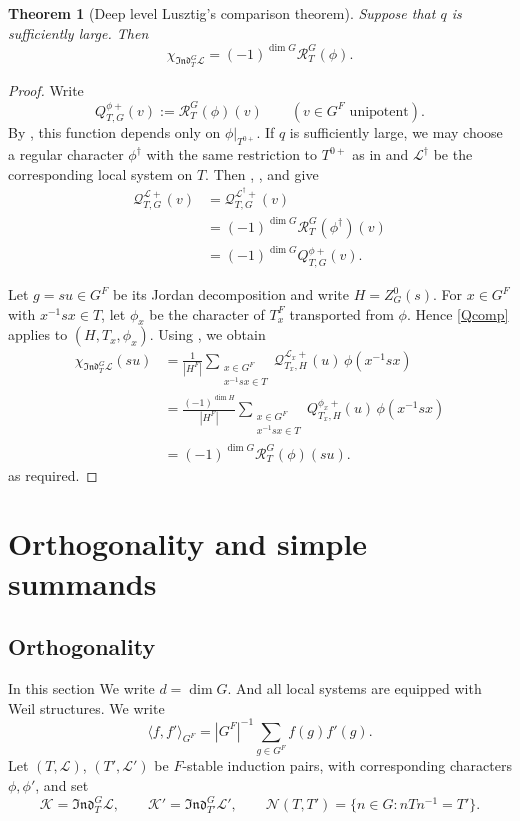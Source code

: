 \documentclass[11pt,letterpaper]{amsart}
\newtheorem{theorem}{Theorem}
\theoremstyle{definition}
\numberwithin{equation}{section}
\numberwithin{theorem}{section}
\begin{document}
\begin{theorem}[Deep level Lusztig's comparison theorem]
\label{LC}
Suppose that $q$ is sufficiently large. Then
\[
 \chi_{\mathfrak{Ind}^{G}_{T}\mathcal L}
 =(-1)^{\dim G}\mathcal R^{G}_{T}(\phi).
\]
\end{theorem}
\begin{proof}
Write
\[
 Q_{T,G}^{\phi+}(v)
 :=\mathcal R_T^G(\phi)(v)
 \qquad (v\in G^F\text{ unipotent}).
\]
By \cite[Theorem 3.1]{LN26}, this function depends only on
$\phi|_{T^{0+}}$. If $q$ is sufficiently large, we may choose a
regular character $\phi^\dagger$ with the same restriction to $T^{0+}$ as in  and $\mathcal{L}^{\dagger}$ be the corresponding local system on $T$.
Then ,
\cite[Theorem 8.6]{INY25}, and 
\cite[Theorem 3.1]{LN26} give
\begin{equation}\label{Qcomp}
 \begin{aligned}
 \mathcal{Q}_{T,G}^{\mathcal L+}(v)
 &=\mathcal{Q}_{T,G}^{\mathcal L^{\dagger}+}(v)\\
 &=(-1)^{\dim G}\mathcal R_T^G(\phi^\dagger)(v)\\
 &=(-1)^{\dim G} Q_{T,G}^{\phi+}(v).
 \end{aligned}
\end{equation}

Let $g=su\in G^F$ be its Jordan
decomposition and write
$H=Z_G^0(s)$. For $x\in G^F$ with $x^{-1}sx\in T$, let $\phi_x$ be the
character of $T_x^F$ transported from $\phi$. Hence
\eqref{Qcomp} applies to $(H,T_x,\phi_x)$.
Using , we obtain
\begin{align*}
 \chi_{\mathfrak{Ind}^{G}_{T}\mathcal L}(su)
 &=\frac{1}{|H^F|}
   \sum_{\substack{x\in G^F\\x^{-1}sx\in T}}
   \mathcal Q_{T_x,H}^{\mathcal{L}_x+}(u)\,
   \phi(x^{-1}sx)\\
&=\frac{(-1)^{\dim H}}{|H^F|}
   \sum_{\substack{x\in G^F\\x^{-1}sx\in T}}
    Q_{T_x,H}^{\phi_x+}(u)\,
   \phi(x^{-1}sx)\\
 &=(-1)^{\dim G}\mathcal R_T^G(\phi)(su).
\end{align*}
as required.
\end{proof}

\section{Orthogonality and simple summands}
\label{endalg}

\subsection{Orthogonality}
In this section We write $d=\dim G$. And 
all local systems are equipped with
Weil structures. We write
\[
\langle f,f'\rangle_{G^F}=|G^F|^{-1}\sum_{g\in G^F}f(g)f'(g).
\]
Let $(T,\mathcal L)$, $(T',\mathcal L')$ be $F$-stable induction pairs,
with corresponding characters $\phi,\phi'$, and set
\[
 \mathcal K=\mathfrak{Ind}_T^G\mathcal L,\qquad
 \mathcal K'=\mathfrak{Ind}_{T'}^G\mathcal L',\qquad
 \mathcal N(T,T')=\{n\in G:nTn^{-1}=T'\}.
\]
\end{document}
